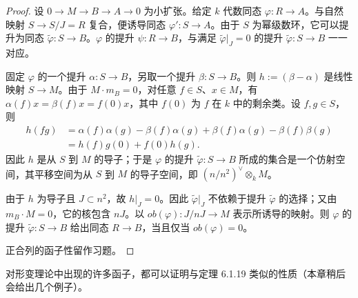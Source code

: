 \begin{proof}
设 $0\to M\to B\to A\to0$ 为小扩张。给定 $k$ 代数同态 $\varphi:R\to A$。与自然映射 $S\to S/J=R$ 复合，便诱导同态 $\varphi':S\to A$。由于 $S$ 为幂级数环，它可以提升为同态 $\widetilde\varphi:S\to B$。$\varphi$ 的提升 $\psi:R\to B$，与满足 $\widetilde\varphi|_J=0$ 的提升 $\widetilde\varphi:S\to B$ 一一对应。

固定 $\varphi$ 的一个提升 $\alpha:S\to B$，另取一个提升 $\beta:S\to B$。则 $h:=(\beta-\alpha)$ 是线性映射 $S\to M$。由于 $M\cdot m_B=0$，对任意 $f\in S$、$x\in M$，有 $\alpha(f)x=\beta(f)x=f(0)x$，其中 $f(0)$ 为 $f$ 在 $k$ 中的剩余类。设 $f,g\in S$，则
\[
\begin{aligned}
h(fg)&=\alpha(f)\alpha(g)-\beta(f)\alpha(g)
       +\beta(f)\alpha(g)-\beta(f)\beta(g)\\
&=h(f)g(0)+f(0)h(g).
\end{aligned}
\]
因此 $h$ 是从 $S$ 到 $M$ 的导子；于是 $\varphi$ 的提升 $\widetilde\varphi:S\to B$ 所成的集合是一个仿射空间，其平移空间为从 $S$ 到 $M$ 的导子空间，即 $(n/n^2)^\vee\otimes_k M$。

由于 $h$ 为导子且 $J\subset n^2$，故 $h|_J=0$。因此 $\widetilde\varphi|_J$ 不依赖于提升 $\widetilde\varphi$ 的选择；又由 $m_B\cdot M=0$，它的核包含 $nJ$。以 $ob(\varphi):J/nJ\to M$ 表示所诱导的映射。则 $\varphi$ 的提升 $\widetilde\varphi:S\to B$ 给出同态 $R\to B$，当且仅当 $ob(\varphi)=0$。

正合列的函子性留作习题。
\end{proof}
对形变理论中出现的许多函子，都可以证明与定理 6.1.19 类似的性质（本章稍后会给出几个例子）。

